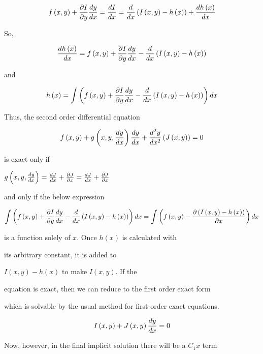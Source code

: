 $$f\left(x,y\right)+{\partial I\over\partial y}{dy \over dx}={dI \over dx}={d \over dx}\left(I\left(x,y\right)-h\left(x\right)\right)+{dh\left(x\right) \over dx}$$



So,



$${dh\left(x\right) \over dx}=f\left(x,y\right)+{\partial I\over\partial y}{dy \over dx}-{d \over dx}\left(I\left(x,y\right)-h\left(x\right)\right)$$



and



$$h\left(x\right)=\int\left(f\left(x,y\right)+{\partial I\over\partial y}{dy \over dx}-{d \over dx}\left(I\left(x,y\right)-h\left(x\right)\right)\right)dx$$



Thus, the second order differential equation



$$f\left(x,y\right)+g\left(x,y,{dy \over dx}\right){dy \over dx}+{d^2y \over dx^2}\left(J\left(x,y\right)\right)=0$$



is exact only if

$g\left(x,y,{dy \over dx}\right)={ dJ\over dx}+{\partial J\over\partial x}={dJ \over dx}+{\partial J\over\partial x}$

and only if the below expression



$$\int\left(f\left(x,y\right)+{\partial I\over\partial y}{dy \over dx}-{d \over dx}\left(I\left(x,y\right)-h\left(x\right)\right)\right)dx=\int \left(f\left(x,y\right)-{\partial \left(I\left(x,y\right)-h\left(x\right)\right)\over\partial x}\right)dx$$



is a function solely of $x$. Once $h\left(x\right)$ is calculated with

its arbitrary constant, it is added to

$I\left(x,y\right)-h\left(x\right)$ to make $I\left(x,y\right)$. If the

equation is exact, then we can reduce to the first order exact form

which is solvable by the usual method for first-order exact equations.



$$I\left(x,y\right)+J\left(x,y\right){dy \over dx}=0$$



Now, however, in the final implicit solution there will be a $C_1x$ term

